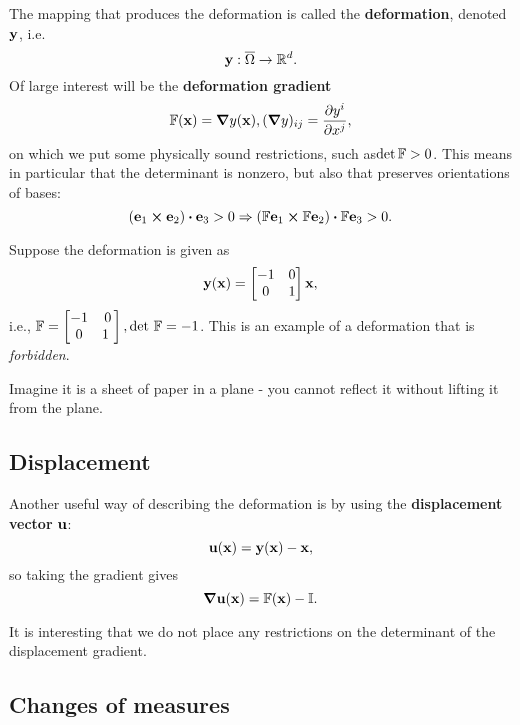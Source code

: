 \documentclass[reqno, a4paper]{article}
\begin{document}
The mapping that produces the deformation is called the \textbf{deformation}, denoted $\vb{y}$, i.e.
\[
	\vb{y}: \overline{\Omega} \to {\mathbb R}^d.
\]
Of large interest will be the \textbf{deformation gradient}
\[
	\mathbb{F}(\vb{x}) = \grad{y}(\vb{x}), (\grad{y})_{ij}=\pdv{y^i}{x^j},
\]
on which we put some physically sound restrictions, such as$\det \mathbb{F}> 0$. This means in particular that the determinant is nonzero, but also that preserves orientations of bases:
\[
(\vb{e}_1 \cross \vb{e}_2) \vdot \vb{e}_3 > 0 \Rightarrow(\fgrad\vb{e}_1 \cross \fgrad \vb{e}_2) \vdot \fgrad \vb{e}_3 >0.
\]

\begin{example}
	Suppose the deformation is given as
	\[
		\vb{y}(\vb{x}) = \begin{bmatrix}-1 & 0 \\ 0 & 1\end{bmatrix} \vb{x},
	\]
i.e., $\fgrad=\begin{bmatrix}-1 & 0 \\ 0 & 1\ \end{bmatrix}, \detf = -1$. This is an example of a deformation that is \textit{forbidden}.

Imagine it is a sheet of paper in a plane - you cannot reflect it without lifting it from the plane.
\end{example}

\subsection{Displacement}
\label{sec:displacement}
Another useful way of describing the deformation is by using the \textbf{displacement vector} $\vb{u}$:
\[
	\vb{u}(\vb{x}) = \vb{y}(\vb{x}) - \vb{x},
\]
so taking the gradient gives
\[
	\grad{\vb{u}(\vb{x})} = \mathbb{F}(\vb{x}) - \mathbb{I}.
\]
\begin{remark}
It is interesting that we do not place any restrictions on the determinant of the displacement gradient.
\end{remark}

\subsection{Changes of measures}
\label{sec:changes}
\end{document}
